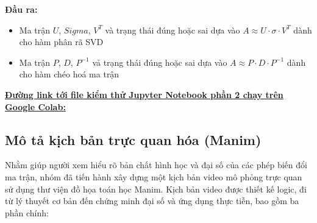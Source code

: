 \documentclass[a4paper]{article}
\begin{document}
\textbf{Đầu ra: }

\begin{itemize}
    \item Ma trận $U$, $Sigma$, $V^T$ và trạng thái đúng hoặc sai dựa vào $A \approx U\cdot \sigma \cdot V^T$ dành cho hàm phân rã SVD
    \item Ma trận $P$, $D$, $P^{-1}$ vả trạng thái đúng hoặc sai dựa vào $A \approx P \cdot D \cdot P^{-1}$  dành cho hàm chéo hoá ma trận
\end{itemize}

\href{https://colab.research.google.com/drive/18lmiWcQ3HkVXbTWlUf2TNsjUcjoghWXM?usp=sharing}{\textbf{Đường link tới file kiểm thử Jupyter Notebook phần 2 chạy trên Google Colab: }}

\subsection{Mô tả kịch bản trực quan hóa (Manim)}
Nhằm giúp người xem hiểu rõ bản chất hình học và đại số của các phép biến đổi ma trận, nhóm đã tiến hành xây dựng một kịch bản video mô phỏng trực quan sử dụng thư viện đồ họa toán học Manim. Kịch bản video được thiết kế logic, đi từ lý thuyết cơ bản đến chứng minh đại số và ứng dụng thực tiễn, bao gồm ba phần chính:
\end{document}
